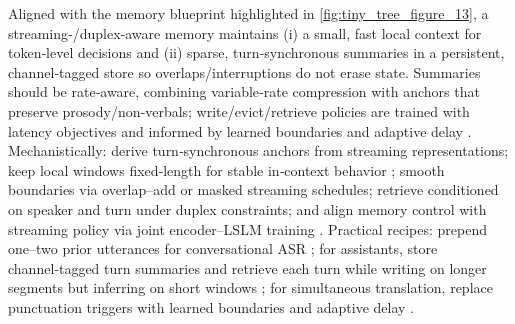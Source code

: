 \documentclass{article}
\begin{document}
Aligned with the memory blueprint highlighted in \autoref{fig:tiny_tree_figure_13}, a streaming‑/duplex‑aware memory maintains (i) a small, fast local context for token‑level decisions and (ii) sparse, turn‑synchronous summaries in a persistent, channel‑tagged store so overlaps/interruptions do not erase state. Summaries should be rate‑aware, combining variable‑rate compression with anchors that preserve prosody/non‑verbals; write/evict/retrieve policies are trained with latency objectives and informed by learned boundaries and adaptive delay \cite{guo2025streamuniachievingstreamingspeechtransla}. Mechanistically: derive turn‑synchronous anchors from streaming representations; keep local windows fixed‑length for stable in‑context behavior \cite{hsu2024exploringcontextlearningtextlessspeechla}; smooth boundaries via overlap–add or masked streaming schedules; retrieve conditioned on speaker and turn under duplex constraints; and align memory control with streaming policy via joint encoder–LSLM training \cite{guo2025streamuniachievingstreamingspeechtransla}. Practical recipes: prepend one–two prior utterances for conversational ASR \cite{li2025seewossubmissionmlcslmlessonslearnedspee}; for assistants, store channel‑tagged turn summaries and retrieve each turn while writing on longer segments but inferring on short windows \cite{nguyen2025qwenvsgemmaintegrationwhispercomparative}; for simultaneous translation, replace punctuation triggers with learned boundaries and adaptive delay \cite{guo2025streamuniachievingstreamingspeechtransla}.
\end{document}
